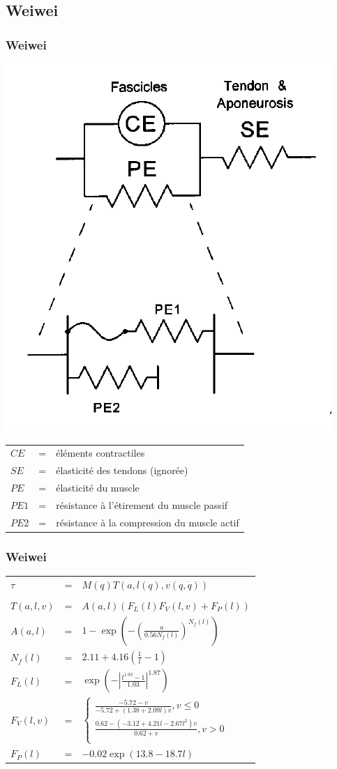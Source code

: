 \documentclass{beamer}
\begin{document}

\subsection{Weiwei}

\begin{frame}
\frametitle{Weiwei}
\begin{center}
        \includegraphics[width=.40\linewidth]{fig/brown}
\end{center}
\begin{tabular}{lcl}
    $CE$  & = & éléments contractiles \\
    $SE$  & = & élasticité des tendons (ignorée) \\
    $PE$  & = & élasticité du muscle \\
    $PE1$ & = & résistance à l'étirement du muscle passif \\
    $PE2$ & = & résistance à la compression du muscle actif \\
\end{tabular}
\end{frame}

\begin{frame}
\frametitle{Weiwei}
\begin{tabular}{lcl}
    $\tau$ & = & $M(q) T(a, l(q), v(q, \dot{q}))$ \\
    \\
    $T(a, l, v)$ & = & $A(a,l)(F_L(l) F_V(l,v) + F_P(l))$ \\
    $A(a, l)$    & = & $1 - \exp \left(- \left(\frac{a}{0.56 N_f(l)}\right)^{N_f(l)}\right)$ \\
    $N_f(l)$     & = & $2.11 + 4.16 \left(\frac{1}{l} - 1\right)$ \\
    $F_L(l)$     & = & $\exp \left(-\left|\frac{l^{1.93} - 1}{1.03}\right|^{1.87}\right)$ \\
    $F_V(l, v)$  & = & $\left\{ 
        \begin{array}{l}
            \frac{-5.72 - v}{-5.72 + (1.38 + 2.09 l) v}, v \leq 0 \\
            \frac{0.62 - \left(-3.12 + 4.21 l - 2.67 l^2\right) v}{0.62 + v}, v > 0 \\
        \end{array}
        \right.$ \\
    $F_P(l)$     & = & $-0.02 \exp(13.8 - 18.7 l)$ \\
\end{tabular}
\end{frame}
\end{document}
